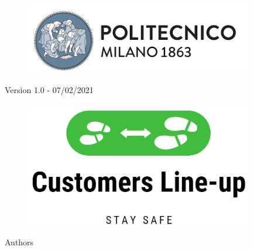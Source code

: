\thispagestyle{empty}
\begin{center}

    \begin{figure}[!h] 
    \centering
    \includegraphics[width=100mm]{./Images/Polimilogo} 
     \end{figure}
    { \small {\mycourse} \par}
\vspace{0.3\baselineskip}
    {\bf \large{\mydep} \par}
\vspace{\baselineskip}
    { \Large {\bfseries {\mytitle}} \par}
\vspace{0.5\baselineskip}
	{ \small {Version 1.0 - 07/02/2021} \par}
\vspace{\baselineskip}
	\begin{figure}[!h] 
    \centering
    \includegraphics[width=100mm]{./Images/MockupLogo/LogoEnorme} 
     \end{figure}
\vspace{0.3\baselineskip}
\vspace{\baselineskip} 
    {Authors \par}
\vspace{0.2\baselineskip}
    {{\large {\bf \myname \\ \myrollno}} \par}

\end{center}
